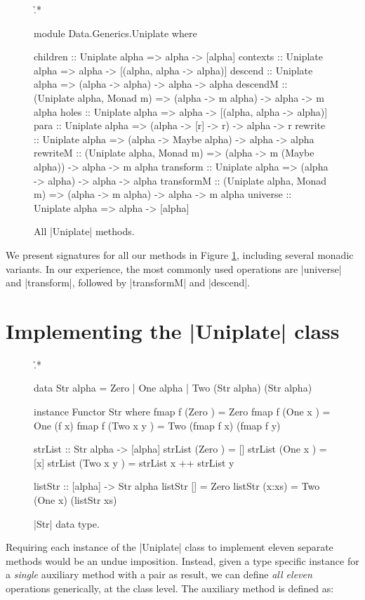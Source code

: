 \begin{figure}
\h{.*}\begin{code}
module Data.Generics.Uniplate where

children    :: Uniplate alpha => alpha -> [alpha]
contexts    :: Uniplate alpha => alpha -> [(alpha, alpha -> alpha)]
descend     :: Uniplate alpha => (alpha -> alpha) -> alpha -> alpha
descendM    :: (Uniplate alpha, Monad m) => (alpha -> m alpha) -> alpha -> m alpha
holes       :: Uniplate alpha => alpha -> [(alpha, alpha -> alpha)]
para        :: Uniplate alpha => (alpha -> [r] -> r) -> alpha -> r
rewrite     :: Uniplate alpha => (alpha -> Maybe alpha) -> alpha -> alpha
rewriteM    :: (Uniplate alpha, Monad m)  => (alpha -> m (Maybe alpha)) -> alpha -> m alpha
transform   :: Uniplate alpha => (alpha -> alpha) -> alpha -> alpha
transformM  :: (Uniplate alpha, Monad m) => (alpha -> m alpha) -> alpha -> m alpha
universe    :: Uniplate alpha => alpha -> [alpha]
\end{code}
\caption{All |Uniplate| methods.}
\label{figU:play}
\end{figure}

We present signatures for all our methods in Figure \ref{figU:play}, including several monadic variants. In our experience, the most commonly used operations are |universe| and |transform|, followed by |transformM| and |descend|.


\section{Implementing the |Uniplate| class}
\label{secU:implement_play}

\begin{figure}
\h{.*}\begin{code}
data Str alpha = Zero | One alpha | Two (Str alpha) (Str alpha)

instance Functor Str where
    fmap f (Zero      ) = Zero
    fmap f (One  x    ) = One (f x)
    fmap f (Two  x y  ) = Two (fmap f x) (fmap f y)

strList :: Str alpha -> [alpha]
strList (Zero      ) = []
strList (One  x    ) = [x]
strList (Two  x y  ) = strList x ++ strList y

listStr :: [alpha] -> Str alpha
listStr []      = Zero
listStr (x:xs)  = Two (One x) (listStr xs)
\end{code}
\caption{|Str| data type.}
\label{figU:str}
\end{figure}

Requiring each instance of the |Uniplate| class to implement eleven separate methods would be an undue imposition. Instead, given a type specific instance for a \textit{single} auxiliary method with a pair as result, we can define \textit{all eleven} operations generically, at the class level. The auxiliary method is defined as:

